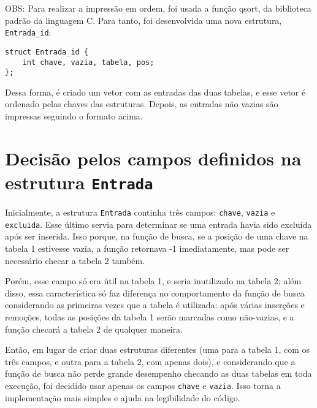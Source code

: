 \documentclass[a4paper, 11pt]{article}
\begin{document}
\begin{itemize}
        OBS: Para realizar a impressão em ordem, foi usada a função qsort, da biblioteca
        padrão da linguagem C. Para tanto, foi desenvolvida uma nova estrutura,
        \texttt{Entrada\_id}:
        \begin{verbatim}
struct Entrada_id {
    int chave, vazia, tabela, pos;
};
        \end{verbatim}
        Dessa forma, é criado um vetor com as entradas das duas tabelas, e esse
        vetor é ordenado pelas chaves das estruturas. Depois, as entradas não vazias
        são impressas seguindo o formato acima.
\end{itemize}

\section{Decisão pelos campos definidos na estrutura \texttt{Entrada}}
Inicialmente, a estrutura \texttt{Entrada} continha três campos: \texttt{chave},
\texttt{vazia} e \texttt{excluida}. Esse último servia para determinar se uma entrada
havia sido excluída após ser inserida. Isso porque, na função de busca, se a posição
de uma chave na tabela 1 estivesse vazia, a função retornava -1 imediatamente, mas
pode ser necessário checar a tabela 2 também.

Porém, esse campo só era útil na tabela 1, e seria inutilizado na tabela 2; além disso,
essa característica só faz diferença no comportamento da função de busca considerando
as primeiras vezes que a tabela é utilizada: após várias inserções e remoções, todas
as posições da tabela 1 serão marcadas como não-vazias, e a função checará a tabela 2
de qualquer maneira.

Então, em lugar de criar duas estruturas diferentes (uma para a tabela 1, com os três
campos, e outra para a tabela 2, com apenas dois), e considerando que a função de busca
não perde grande desempenho checando as duas tabelas em toda execução, foi decidido
usar apenas os campos \texttt{chave} e \texttt{vazia}. Isso torna a implementação mais
simples e ajuda na legibilidade do código.
\end{document}
